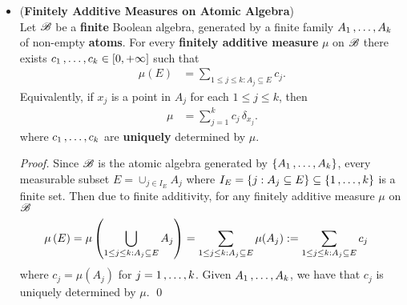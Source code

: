 \documentclass[11pt]{article}
\begin{document}
\begin{itemize}
\item \begin{proposition} (\textbf{Finitely Additive Measures on Atomic Algebra})\\
Let ${\mathscr B}$ be a \textbf{finite} Boolean algebra, generated by a finite family $A_1 \,{,}\ldots{,}\, A_k$ of non-empty \textbf{atoms}. For every \textbf{finitely additive measure} $\mu$ on ${\mathscr B}$ there exists $c_1 \,{,}\ldots{,}\, c_k \in [0, +\infty]$ such that
\begin{align*}
\mu(E) &= \sum_{1 \le j \le k: A_j \subseteq E} c_j.
\end{align*}
Equivalently, if $x_j$ is a point in $A_j$ for each $1 \le j \le k$, then
\begin{align*}
\mu &= \sum_{j=1}^{k}c_j\,\delta_{x_j}. 
\end{align*}
where $c_1 \,{,}\ldots{,}\, c_k$ are \textbf{uniquely} determined by $\mu$.
\end{proposition}
\begin{proof}
Since ${\mathscr B}$ is the atomic algebra generated by $\left\{A_1 \,{,}\ldots{,}\, A_k\right\}$, every measurable subset $E = \cup_{j \in I_{E}}A_{j}$ where $I_E = \left\{j:  A_j \subseteq E\right\} \subseteq \left\{1 \,{,}\ldots{,}\, k\right\}$ is a finite set. Then due to finite additivity, for any finitely additive measure $\mu$ on ${\mathscr B}$
\begin{align*}
\mu\left(E\right) = \mu\left( \bigcup_{1 \le j \le k: A_j \subseteq E}A_{j}\right) &= \sum_{1 \le j \le k: A_j \subseteq E}\mu(A_{j}) :=  \sum_{1 \le j \le k: A_j \subseteq E}c_j
\end{align*} where $c_j = \mu(A_j)$ for $j=1 \,{,}\ldots{,}\, k$. Given  $A_1 \,{,}\ldots{,}\, A_k$, we have that $c_j$ is uniquely determined by $\mu$. \qed
\end{proof}
\end{itemize}
\end{document}
